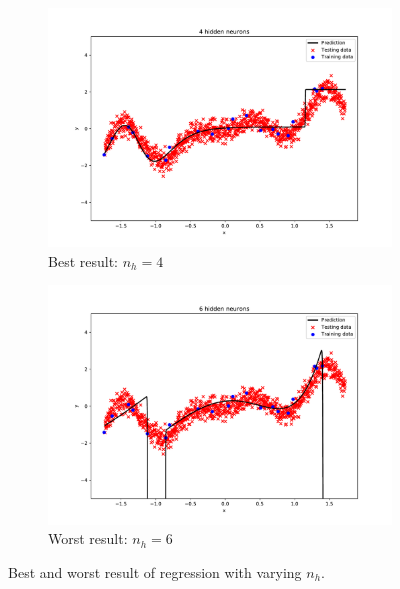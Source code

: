 \documentclass{article}
\begin{document}
\begin{figure}[!ht]
\centering
\begin{subfigure}{0.8\textwidth}
\includegraphics[width=\textwidth]{./Figures/1_1_c_nh_besttest.pdf}
\caption{Best result: $n_h=4$}
\label{1_1_c_best}
\end{subfigure}

\begin{subfigure}{0.8\textwidth}
\includegraphics[width=\textwidth]{./Figures/1_1_c_nh_worsttest.pdf}
\caption{Worst result: $n_h=6$}
\label{1_1_c_worst}
\end{subfigure}

\caption{Best and worst result of regression with varying $n_h$.}
\label{1_1_c_bestworst}
\end{figure}

\clearpage
\end{document}
